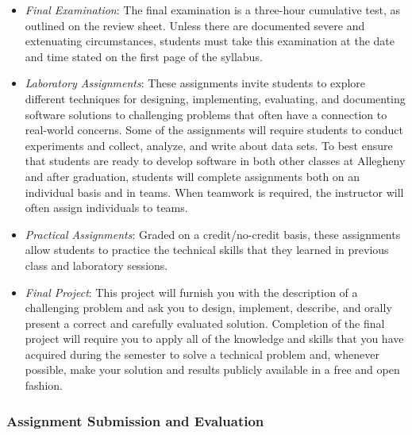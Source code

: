 \documentclass[11pt]{article}
\begin{document}
\begin{itemize}
  \item {\em Final Examination\/}: The final examination is a three-hour
    cumulative test, as outlined on the review sheet. Unless there are
    documented severe and extenuating circumstances, students must take this
    examination at the date and time stated on the first page of the syllabus.

  \item {\em Laboratory Assignments\/}: These assignments invite students to
    explore different techniques for designing, implementing, evaluating, and
    documenting software solutions to challenging problems that often have a
    connection to real-world concerns. Some of the assignments will require
    students to conduct experiments and collect, analyze, and write about data
    sets. To best ensure that students are ready to develop software in both
    other classes at Allegheny and after graduation, students will complete
    assignments both on an individual basis and in teams. When teamwork is
    required, the instructor will often assign individuals to teams.

  \item {\em Practical Assignments\/}: Graded on a credit/no-credit basis, these
    assignments allow students to practice the technical skills that they
    learned in previous class and laboratory sessions.

  \item {\em Final Project\/}: This project will furnish you with the
    description of a challenging problem and ask you to design, implement,
    describe, and orally present a correct and carefully evaluated solution.
    Completion of the final project will require you to apply all of the
    knowledge and skills that you have acquired during the semester to solve a
    technical problem and, whenever possible, make your solution and results
    publicly available in a free and open fashion.

\end{itemize}

\subsubsection*{Assignment Submission and Evaluation}
\end{document}

